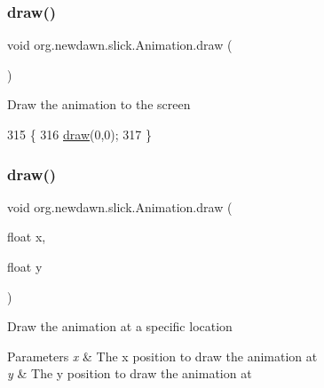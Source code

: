 \mbox{\label{classorg_1_1newdawn_1_1slick_1_1_animation_a7ff3b50dcc4c72c83ada402daa6fe5f3}} 
\subsubsection{\texorpdfstring{draw()}{draw()}\hspace{0.1cm}{\footnotesize\ttfamily [1/5]}}
{\footnotesize\ttfamily void org.\+newdawn.\+slick.\+Animation.\+draw (\begin{DoxyParamCaption}{ }\end{DoxyParamCaption})\hspace{0.3cm}{\ttfamily [inline]}}

Draw the animation to the screen 
\begin{DoxyCode}
315                        \{
316         \mbox{\hyperlink{classorg_1_1newdawn_1_1slick_1_1_animation_a7ff3b50dcc4c72c83ada402daa6fe5f3}{draw}}(0,0);
317     \}
\end{DoxyCode}
\mbox{\label{classorg_1_1newdawn_1_1slick_1_1_animation_a37ae4bfbc6158fade8e1e7efdde039af}} 
\subsubsection{\texorpdfstring{draw()}{draw()}\hspace{0.1cm}{\footnotesize\ttfamily [2/5]}}
{\footnotesize\ttfamily void org.\+newdawn.\+slick.\+Animation.\+draw (\begin{DoxyParamCaption}\item[{float}]{x,  }\item[{float}]{y }\end{DoxyParamCaption})\hspace{0.3cm}{\ttfamily [inline]}}

Draw the animation at a specific location


\begin{DoxyParams}{Parameters}
{\em x} & The x position to draw the animation at \\
\hline
{\em y} & The y position to draw the animation at \\
\hline
\end{DoxyParams}


